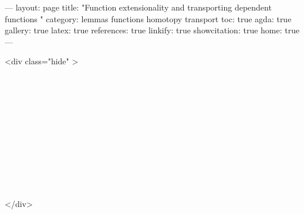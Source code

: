 ---
layout: page
title: "Function extensionality and transporting dependent functions "
category: lemmas functions homotopy transport
toc: true
agda: true
gallery: true
latex: true
references: true
linkify: true
showcitation: true
home: true
---

<div class="hide" >
\begin{code}%
\>[0]\AgdaSymbol{\{-\#}\AgdaSpace{}%
\AgdaSpace{}%
\AgdaSpace{}%
\AgdaSymbol{\#-\}}\<%
\\
\>[0]\AgdaSpace{}%
\AgdaModule{\AgdaUnderscore{}}\AgdaSpace{}%
\<%
\\
\>[0]\AgdaSpace{}%
\AgdaSpace{}%
\<%
\\
\>[0]\AgdaSpace{}%
\AgdaSpace{}%
\<%
\\
%
\\[\AgdaEmptyExtraSkip]%
\>[0]\AgdaSpace{}%
\AgdaSpace{}%
\<%
\\
%
\\[\AgdaEmptyExtraSkip]%
\>[0]\AgdaSpace{}%
\AgdaSpace{}%
\<%
\\
\>[0]\AgdaSpace{}%
\AgdaSpace{}%
\<%
\\
\>[0]\AgdaSpace{}%
\AgdaSpace{}%
\<%
\\
\>[0]\AgdaSpace{}%
\AgdaSpace{}%
\<%
\end{code}
</div>

